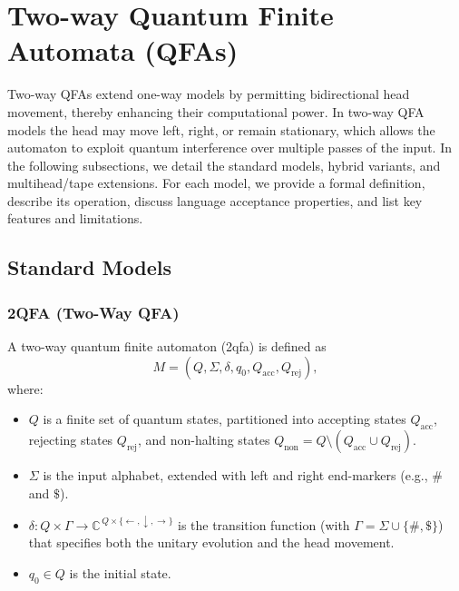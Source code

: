 \section{Two-way Quantum Finite Automata (QFAs)}
\label{sec:two-way-qfas}

Two-way QFAs extend one-way models by permitting bidirectional head movement, thereby enhancing their computational power. In two-way QFA models the head may move left, right, or remain stationary, which allows the automaton to exploit quantum interference over multiple passes of the input. In the following subsections, we detail the standard models, hybrid variants, and multihead/tape extensions. For each model, we provide a formal definition, describe its operation, discuss language acceptance properties, and list key features and limitations.

\subsection{Standard Models}
\label{subsec:two-way-standard}

\subsubsection{2QFA (Two-Way QFA)}
\label{sssec:2qfa}
\begin{definition}[2QFA]
A two-way quantum finite automaton (\gls{2qfa}) is defined as 
\[
M = (Q, \Sigma, \delta, q_0, Q_{\text{acc}}, Q_{\text{rej}}),
\]
where:
\begin{itemize}
    \item \( Q \) is a finite set of quantum states, partitioned into accepting states \( Q_{\text{acc}} \), rejecting states \( Q_{\text{rej}} \), and non-halting states \( Q_{\text{non}} = Q \setminus (Q_{\text{acc}} \cup Q_{\text{rej}}) \).
    \item \( \Sigma \) is the input alphabet, extended with left and right end-markers (e.g., \( \# \) and \( \$ \)).
    \item \( \delta: Q \times \Gamma \to \mathbb{C}^{\, Q \times \{ \leftarrow, \downarrow, \rightarrow \}} \) is the transition function (with \( \Gamma = \Sigma \cup \{ \#, \$ \} \)) that specifies both the unitary evolution and the head movement.
    \item \( q_0 \in Q \) is the initial state.
\end{itemize}
\end{definition}

